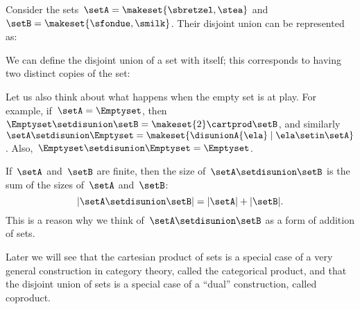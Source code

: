 

Consider the sets~$\setA=\makeset{\sbretzel, \stea}$ and~$\setB=\makeset{\sfondue, \smilk}$.
Their disjoint union can be represented as:

We can define the disjoint union of a set with itself; this corresponds to having two distinct copies of the set:


Let us also think about what happens when the empty set is at play.
For example, if~$\setA = \Emptyset$, then~$\Emptyset \setdisunion \setB =  \makeset{2} \cartprod \setB$, and similarly~$\setA \setdisunion \Emptyset =  \makeset{ \disunionA{\ela} \mid \ela \setin\setA }$.
Also,~$\Emptyset \setdisunion \Emptyset = \Emptyset$.

\begin{remark}
    If~$\setA$ and~$\setB$ are finite, then the size of~$\setA \setdisunion \setB$ is the sum of the sizes of~$\setA$ and~$\setB$:
    \begin{equation*}
        \vert \setA \setdisunion \setB \vert = \vert \setA \vert + \vert \setB \vert.
    \end{equation*}
    This is a reason why we think of~$\setA \setdisunion \setB$ as a form of addition of sets.
\end{remark}

\begin{remark}
    Later we will see that the cartesian product of sets is a special case of a very general construction in category theory, called the categorical product, and that the disjoint union of sets is a special case of a ``dual'' construction, called coproduct.
\end{remark}

